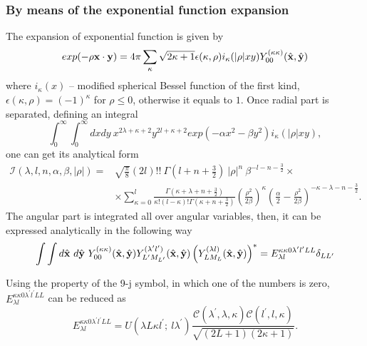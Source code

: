 \documentclass[12pt,a4paper,twoside]{article}
\begin{document}
\subsubsection{By means of the  exponential function expansion}
\label{overlap_by_exp}
The expansion of exponential function is given by 
\begin{equation}
exp(-\rho {\bf x} \cdot {\bf y}) = 4 \pi \sum_{\kappa} \sqrt{2\kappa+1} 
\epsilon(\kappa, \rho)i_{\kappa}(|\rho|xy)Y_{00}^{(\kappa\kappa)}(\hat{{\bf x}},\hat{{\bf y}})
\end{equation} 
where $i_{\kappa}(x) $ -- modified spherical Bessel function of the first kind, $\epsilon(\kappa, \rho)=(-1)^{\kappa}$ for $\rho \le 0$, otherwise it equals to $1$.
Once radial part is separated, defining an integral
\begin{equation}
\int_0^\infty \int_0^\infty  dx dy~ x^{2\lambda+\kappa+2}y^{2 l +\kappa+2} exp\left( -\alpha x^2 - \beta y^2 \right) i_{\kappa}(|\rho|xy),
\end{equation}
one can get its analytical form
\begin{align}
\mathcal{I}(\lambda, l, n, \alpha, \beta, |\rho|) =& \sqrt{\frac{\pi}{8}}(2l)!!~ \Gamma(l+n+\tfrac{3}{2})~|\rho|^{n} ~\beta^{-l-n-\tfrac{3}{2}} \times \nonumber \\
& \times \sum_{\kappa=0}^{l} \frac{\Gamma(\kappa+\lambda+n+\tfrac{3}{2})}{\kappa! (l-\kappa)! \Gamma(\kappa+n+\tfrac{3}{2})}
\left(\frac{\rho^2}{2\beta}\right)^{\kappa} \left( \frac{\alpha}{2} - \frac{\rho^2}{2\beta}  \right)^{-\kappa-\lambda-n-\tfrac{3}{2}}.
\label{overlap1}
\end{align}
The angular part is integrated all over angular variables, then,  it can be expressed analytically in the following way
\begin{align}
\int \int d\hat{\bf x}~d\hat{\bf y}~ Y_{00}^{(\kappa\kappa)}(\hat{{\bf x}},\hat{{\bf y}})  Y_{L^{\prime}M_{L^{\prime}}}^{(\lambda^{\prime} l^{\prime})}(\hat{{\bf x}},\hat{{\bf y}}) \left(  Y_{LM_L}^{(\lambda l)}(\hat{{\bf x}},\hat{{\bf y}}) \right)^{*} =  {E}^{\kappa \kappa 0 \lambda^{\prime} l^{\prime} L L}_{\lambda l} \delta_{LL^{\prime}} 
\label{angular_part_overlap1}
\end{align}

Using the property of the 9-j symbol, in which one of the numbers is zero, ${E}^{\kappa \kappa 0 \lambda^{\prime} l^{\prime} L L}_{\lambda l}$ can be reduced as
\begin{equation}
{E}^{\kappa \kappa 0 \lambda^{\prime} l^{\prime} L L}_{\lambda l}
=U\left(  \lambda L \kappa l^{\prime};~ l \lambda^{\prime} \right) \frac{\mathcal{C} \left( \lambda^{\prime}, \lambda, \kappa \right) \mathcal{C} \left( l^{\prime}, l, \kappa \right) }{ \sqrt{\left( 2L+1 \right) \left( 2\kappa +1 \right)}}.
\end{equation}
\end{document}
